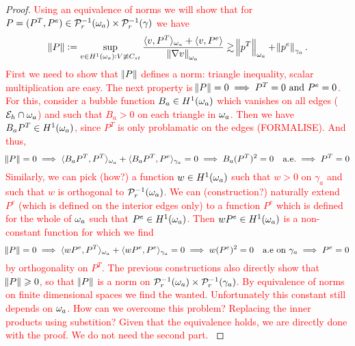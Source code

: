 \documentclass[thesis.tex]{subfiles}
\begin{document}
\begin{proof}
  \textcolor{red}{
  Using an equivalence of norms we will show that for $P = (P^T, P^e) \in \mathcal{P}_r^{-1}(\omega_a) \times \mathcal{P}_r^{-1}(\gamma)$ we have
    \[
      \|P\| := \sup_{v \in H^1(\omega_a) : V\not \equiv C_{st}} \frac{\langle{v, P^T}\rangle_{\omega_a} + \langle v, P^e \rangle}{\norm{\nabla v}_{\omega_a}} \gtrsim
      \norm{p^T}_{\omega_a} + \norm{p^e}_{\gamma_a}.
    \]
    First we need to show that $\norm{P}$ defines a norm: triangle inequality, scalar multiplication are easy.
    The next property is $\norm{P} = 0 \implies P^T = 0 \text{ and }  P^e = 0$. For this, consider a bubble function $B_a \in H^1(\omega_a)$
    which vanishes on all edges  ($\mathcal{E}_h \cap \omega_a$) and such that $B_a > 0$ on each triangle in $\omega_a$. Then we have $B_a P^T \in H^1(\omega_a)$, since $P^T$ is only problamatic on the edges (FORMALISE). And thus,
    \[
      \norm{P} = 0 \implies \langle{B_aP^T, P^T}\rangle_{\omega_a} + \langle B_aP^T, P^e \rangle_{\gamma_a} = 0 \implies B_a(P^T)^2 = 0\quad\text{a.e.} \implies P^T = 0
    \]
    Similarly, we can pick (how?) a function $w \in H^1(\omega_a)$ such that $w > 0$ on $\gamma_a$ and such that $w$ is orthogonal to $\mathcal{P}_r^{-1}(\omega_a)$.
    We can (construction?) naturally extend $P^e$ (which is defined on the interior edges only) to a function $P^e$ which is defined for the whole of $\omega_a$ such that $P^e \in H^1(\omega_a)$. Then $wP^e \in H^1(\omega_a)$ is a non-constant function for which we find
    \[
      \norm{P} = 0 \implies \langle{wP^e, P^T}\rangle_{\omega_a} + \langle wP^e, P^e \rangle_{\gamma_a}  = 0 \implies w(P^e)^2 = 0 \quad\text{a.e on }\gamma_a \implies P^e = 0
    \]
    by orthogonality on $P^T$.
    The previous constructions also directly show that $\norm{P} \geqslant 0$, so that $\norm{P}$ is a norm on $\mathcal{P}_r^{-1}(\omega_a)\times\mathcal{P}_r^{-1}(\gamma_a)$. By equivalence of norms on finite dimensional spaces we find the wanted. Unfortunately this constant
    still depends on $\omega_a$. How can we overcome this problem? Replacing the inner products using substition?
    Given that the equivalence holds, we are directly done with the proof. We do not need the second part.
  }


\end{proof}
\end{document}
